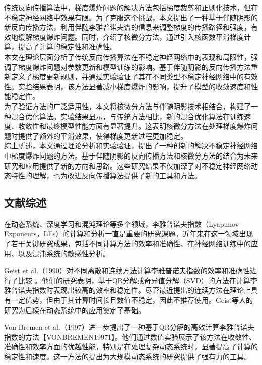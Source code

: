 \documentclass[12pt,a4paper]{amsart}
\begin{document}
传统反向传播算法中，梯度爆炸问题的解决方法包括梯度裁剪和正则化技术，但在不稳定神经网络中效果有限。为了克服这个挑战，本文提出了一种基于伴随阴影的新反向传播方法，利用伴随李雅普诺夫谱的信息来调整梯度的传播路径和强度，有效地缓解梯度爆炸问题。同时，介绍了核微分方法，通过引入核函数平滑梯度计算，提高了计算的稳定性和准确性。\\

本文在理论层面分析了传统反向传播算法在不稳定神经网络中的表现和局限性，强调了梯度爆炸问题对参数更新和模型训练的影响。基于伴随阴影的反向传播方法重新定义了梯度更新规则，并通过实验验证了其在不同类型不稳定神经网络中的有效性。实验结果表明，该方法显著减小梯度爆炸的影响，提升了模型的收敛速度和性能稳定性。\\

为了验证方法的广泛适用性，本文将核微分方法与伴随阴影技术相结合，构建了一种混合优化算法。实验结果显示，与传统方法相比，新的混合优化算法在训练速度、收敛性和最终模型性能方面有显著提升。这表明核微分方法在处理梯度爆炸问题时提供了额外的平滑效果，使得梯度更新过程更加稳定。\\

综上所述，本文通过理论分析和实验验证，提出了一种创新的解决不稳定神经网络中梯度爆炸问题的方法。基于伴随阴影的反向传播方法和核微分方法的结合为未来研究和应用提供了新的方向和思路。这些研究结果不仅加深了对不稳定神经网络动态特性的理解，也为改进反向传播算法提供了新的工具和方法。\\

\subsection{文献综述}

在动态系统、深度学习和混沌理论等多个领域，李雅普诺夫指数（Lyapunov Exponents，LEs）的计算和分析一直是重要的研究课题。近年来在这一领域出现了若干关键研究成果，包括不同计算方法的效率和准确性、在神经网络训练中的应用、以及混沌系统的敏感性分析。

Geist et al.（1990）对不同离散和连续方法计算李雅普诺夫指数的效率和准确性进行了比较 \cite{Geist1990}。他们的研究表明，基于QR分解或奇异值分解（SVD）的方法在计算李雅普诺夫指数时表现出较高的效率和稳定性。尽管最近提出的连续方法在理论上具有一定优势，但由于其计算时间长且数值不稳定，因此不推荐使用。Geist等人的研究为后续在动态系统中的应用奠定了基础。

Von Bremen et al.（1997）进一步提出了一种基于QR分解的高效计算李雅普诺夫指数的方法【VONBREMEN19971】。他们通过数值实验展示了该方法在收敛性、准确性和效率方面的优越性能，特别是在处理复杂动态系统时，显著提高了计算的稳定性和速度。这一方法的提出为大规模动态系统的研究提供了强有力的工具。
\end{document}
